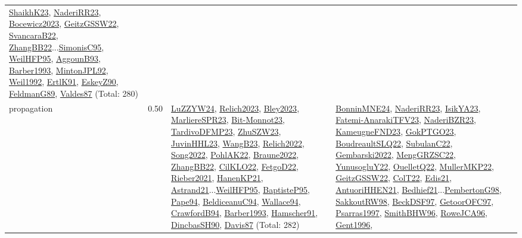 {\begin{longtable}{p{3cm}r>{\raggedright\arraybackslash}p{6cm}>{\raggedright\arraybackslash}p{6cm}>{\raggedright\arraybackslash}p{8cm}}
\hyperref[detail:ShaikhK23]{ShaikhK23}, \hyperref[detail:NaderiRR23]{NaderiRR23}, \hyperref[detail:Bocewicz2023]{Bocewicz2023}, \hyperref[detail:GeitzGSSW22]{GeitzGSSW22}, \hyperref[detail:SvancaraB22]{SvancaraB22}, \hyperref[detail:ZhangBB22]{ZhangBB22}...\hyperref[detail:SimonisC95]{SimonisC95}, \hyperref[detail:WeilHFP95]{WeilHFP95}, \hyperref[detail:AggounB93]{AggounB93}, \hyperref[detail:Barber1993]{Barber1993}, \hyperref[detail:MintonJPL92]{MintonJPL92}, \hyperref[detail:Weil1992]{Weil1992}, \hyperref[detail:ErtlK91]{ErtlK91}, \hyperref[detail:EskeyZ90]{EskeyZ90}, \hyperref[detail:FeldmanG89]{FeldmanG89}, \hyperref[detail:Valdes87]{Valdes87} (Total: 280)\\
\index{propagation}\index{CP!propagation}propagation &  0.50 & \hyperref[detail:LuZZYW24]{LuZZYW24}, \hyperref[detail:Relich2023]{Relich2023}, \hyperref[detail:Bley2023]{Bley2023}, \hyperref[detail:MarliereSPR23]{MarliereSPR23}, \hyperref[detail:Bit-Monnot23]{Bit-Monnot23}, \hyperref[detail:TardivoDFMP23]{TardivoDFMP23}, \hyperref[detail:ZhuSZW23]{ZhuSZW23}, \hyperref[detail:JuvinHHL23]{JuvinHHL23}, \hyperref[detail:WangB23]{WangB23}, \hyperref[detail:Relich2022]{Relich2022}, \hyperref[detail:Song2022]{Song2022}, \hyperref[detail:PohlAK22]{PohlAK22}, \hyperref[detail:Braune2022]{Braune2022}, \hyperref[detail:ZhangBB22]{ZhangBB22}, \hyperref[detail:CilKLO22]{CilKLO22}, \hyperref[detail:FetgoD22]{FetgoD22}, \hyperref[detail:Rieber2021]{Rieber2021}, \hyperref[detail:HanenKP21]{HanenKP21}, \hyperref[detail:Astrand21]{Astrand21}...\hyperref[detail:WeilHFP95]{WeilHFP95}, \hyperref[detail:BaptisteP95]{BaptisteP95}, \hyperref[detail:Pape94]{Pape94}, \hyperref[detail:BeldiceanuC94]{BeldiceanuC94}, \hyperref[detail:Wallace94]{Wallace94}, \hyperref[detail:CrawfordB94]{CrawfordB94}, \hyperref[detail:Barber1993]{Barber1993}, \hyperref[detail:Hamscher91]{Hamscher91}, \hyperref[detail:DincbasSH90]{DincbasSH90}, \hyperref[detail:Davis87]{Davis87} (Total: 282) & \hyperref[detail:BonninMNE24]{BonninMNE24}, \hyperref[detail:NaderiRR23]{NaderiRR23}, \hyperref[detail:IsikYA23]{IsikYA23}, \hyperref[detail:Fatemi-AnarakiTFV23]{Fatemi-AnarakiTFV23}, \hyperref[detail:NaderiBZR23]{NaderiBZR23}, \hyperref[detail:KameugneFND23]{KameugneFND23}, \hyperref[detail:GokPTGO23]{GokPTGO23}, \hyperref[detail:BoudreaultSLQ22]{BoudreaultSLQ22}, \hyperref[detail:SubulanC22]{SubulanC22}, \hyperref[detail:Gembarski2022]{Gembarski2022}, \hyperref[detail:MengGRZSC22]{MengGRZSC22}, \hyperref[detail:YunusogluY22]{YunusogluY22}, \hyperref[detail:OuelletQ22]{OuelletQ22}, \hyperref[detail:MullerMKP22]{MullerMKP22}, \hyperref[detail:GeitzGSSW22]{GeitzGSSW22}, \hyperref[detail:ColT22]{ColT22}, \hyperref[detail:Edis21]{Edis21}, \hyperref[detail:AntuoriHHEN21]{AntuoriHHEN21}, \hyperref[detail:Bedhief21]{Bedhief21}...\hyperref[detail:PembertonG98]{PembertonG98}, \hyperref[detail:SakkoutRW98]{SakkoutRW98}, \hyperref[detail:BeckDSF97]{BeckDSF97}, \hyperref[detail:GetoorOFC97]{GetoorOFC97}, \hyperref[detail:Psarras1997]{Psarras1997}, \hyperref[detail:SmithBHW96]{SmithBHW96}, \hyperref[detail:RoweJCA96]{RoweJCA96}, \hyperref[detail:Gent1996]{Gent1996}, 
\end{longtable}}
